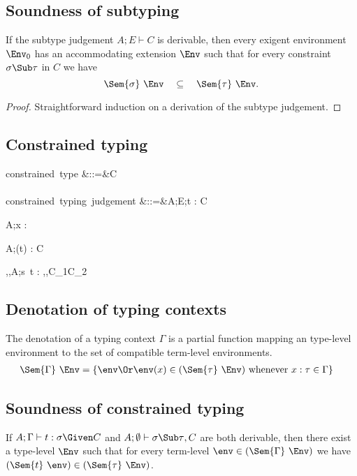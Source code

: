 \documentclass{amsart}
\theoremstyle{definition}
\begin{document}
\subsection{Soundness of subtyping}
\label{subsound}
If the subtype judgement $A;E\vdash C$ is derivable, then every
exigent environment $\Env_0$ has an accommodating extension
$\Env$ such that for every constraint $\sigma\Sub\tau$ in $C$ we
have
\[
\Sem{\sigma}~\Env \quad \subseteq \quad \Sem{\tau}~\Env.
\]

\begin{proof}
Straightforward induction on a derivation of the subtype judgement.
\end{proof}

\subsection{Constrained typing}
\begin{syntax}
\mbox{constrained type}
&::=&\tau \Given C
\\\\
\mbox{constrained typing judgement}
&::=&A;E;\Gamma \vdash t : \tau \Given C
\end{syntax}

{A;\Gamma\vdash x : \tau \Given \emptyset}

{A;\Gamma\vdash (t) : \sigma\R\tau \Given C}

{\alpha,\beta,A;\Gamma\vdash s~t : \beta \Given
\sigma\Sub\alpha\R\beta,\tau\Sub\alpha,C_1\cup C_2}

\subsection{Denotation of typing contexts}
The denotation of a typing context $\Gamma$ is a partial function
mapping an type-level environment to the set of compatible
term-level environments.
\begin{align*}
\Sem{\Gamma}~\Env&=
\left\{\env \Or
\env(x)\in(\Sem{\tau}~\Env)\text{ whenever }x:\tau\in\Gamma
\right\}
\end{align*}

\subsection{Soundness of constrained typing}
\label{consound}
If
$A;\Gamma\vdash t : \sigma\Given C$ and
$A;\emptyset\vdash{\sigma\Sub\tau},C$
are both derivable, then there exist a type-level $\Env$ such
that for every term-level $\env\in(\Sem{\Gamma}~\Env)$ we have
$(\Sem{t}~\env)\in(\Sem{\tau}~\Env)$.
\end{document}
